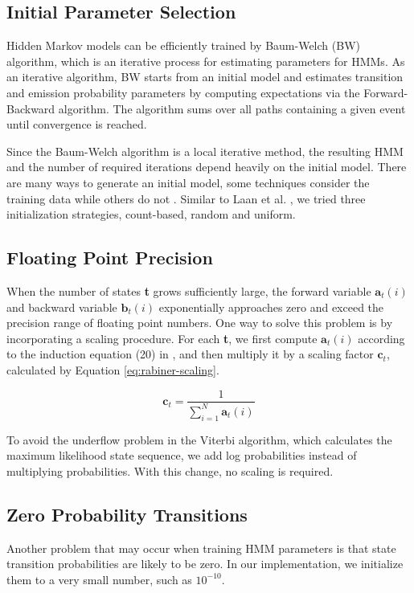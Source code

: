 \subsection{Initial Parameter Selection}

Hidden Markov models can be efficiently trained by Baum-Welch (BW) algorithm, which is an iterative process for estimating parameters for HMMs. 
As an iterative algorithm, BW starts from an initial model and estimates transition and emission probability parameters by computing expectations via the Forward-Backward algorithm.
The algorithm sums over all paths containing a given event until convergence is reached.

Since the Baum-Welch algorithm is a local iterative method, the resulting HMM and the number of required iterations depend heavily on the initial model. 
There are many ways to generate an initial model, some techniques consider the training data while others do not \cite{Laan}.
Similar to Laan et al. \cite{Laan}, we tried three initialization strategies,  count-based, random and uniform. %



\subsection{Floating Point Precision}

When the number of states \textbf{t} grows sufficiently large, the forward variable $\textbf{a}_t(i)$ and backward variable  $\textbf{b}_t(i)$  exponentially approaches zero and exceed the precision range of floating point numbers.
One way to solve this problem is by incorporating a scaling procedure.
For each \textbf{t}, we first compute $\textbf{a}_t(i)$ according to the induction equation (20) in  \cite{Rabiner1989}, and then multiply it by a scaling factor  $\textbf{c}_t$, calculated by Equation \ref{eq:rabiner-scaling}.

\begin{equation}\label{eq:rabiner-scaling}
\textbf{c}_t = \frac{1}{ \displaystyle\sum_{i=1}^N \textbf{a}_t(i)}
\end{equation}

To avoid the underflow problem in the Viterbi algorithm, which calculates the maximum likelihood state sequence, we add log probabilities instead of multiplying probabilities.
With this change, no scaling is required.

\subsection{Zero Probability Transitions}
Another problem that may occur when training HMM parameters is that state transition probabilities are likely to be zero.
In our implementation, we initialize them to a very small number, such as \textbf{ $10^{-10}$}.



